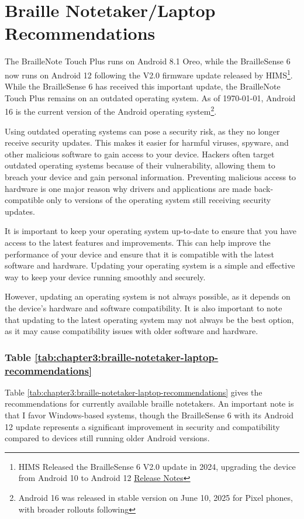 \section{Braille Notetaker/Laptop Recommendations}\label{braille-notetakers-and-braille-laptop-computers-recommend}
The BrailleNote Touch Plus runs on Android 8.1 Oreo, while the BrailleSense 6 now runs on Android 12 following the V2.0 firmware update released by HIMS\footnote{HIMS Released the BrailleSense 6 V2.0 update in 2024, upgrading the device from Android 10 to Android 12 \href{https://www.himsintl.com/en/public_relations/media.php?bgu=view&idx=56}{Release Notes}}. While the BrailleSense 6 has received this important update, the BrailleNote Touch Plus remains on an outdated operating system. As of \today, Android 16 is the current version of the Android operating system\footnote{Android 16 was released in stable version on June 10, 2025 for Pixel phones, with broader rollouts following}.

Using outdated operating systems can pose a security risk, as they no longer receive security updates. This makes it easier for harmful viruses, spyware, and other malicious software to gain access to your device. Hackers often target outdated operating systems because of their vulnerability, allowing them to breach your device and gain personal information. Preventing malicious access to hardware is one major reason why drivers and applications are made back-compatible only to versions of the operating system still receiving security updates.

It is important to keep your operating system up-to-date to ensure that you have access to the latest features and improvements. This can help improve the performance of your device and ensure that it is compatible with the latest software and hardware. Updating your operating system is a simple and effective way to keep your device running smoothly and securely.

However, updating an operating system is not always possible, as it depends on the device's hardware and software compatibility. It is also important to note that updating to the latest operating system may not always be the best option, as it may cause compatibility issues with older software and hardware.

\subsubsection{Table \ref{tab:chapter3:braille-notetaker-laptop-recommendations}}
Table \ref{tab:chapter3:braille-notetaker-laptop-recommendations} gives the recommendations for currently available braille notetakers. An important note is that I favor Windows-based systems, though the BrailleSense 6 with its Android 12 update represents a significant improvement in security and compatibility compared to devices still running older Android versions.

